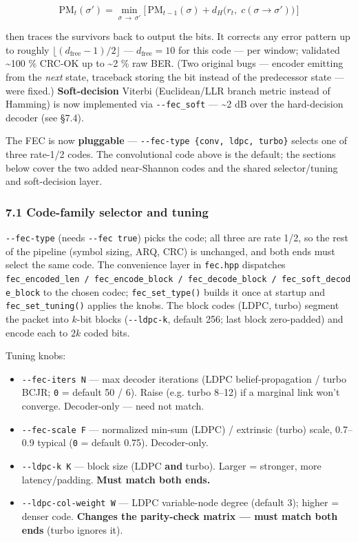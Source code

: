 \documentclass[
  10pt,
]{article}
\providecommand{\tightlist}{%
  \setlength{\itemsep}{0pt}\setlength{\parskip}{0pt}}
\begin{document}
\[ \text{PM}_t(\sigma') = \min_{\sigma \,\to\, \sigma'}
\Big[\, \text{PM}_{t-1}(\sigma) + d_H\big(r_t,\; c(\sigma\!\to\!\sigma')\big) \,\Big] \]

then traces the survivors back to output the bits. It corrects any error
pattern up to roughly \(\lfloor (d_\text{free}-1)/2 \rfloor\) ---
\(d_\text{free} = 10\) for this code --- per window; validated
\textasciitilde100 \% CRC-OK up to \textasciitilde2 \% raw BER. (Two
original bugs --- encoder emitting from the \emph{next} state, traceback
storing the bit instead of the predecessor state --- were fixed.)
\textbf{Soft-decision} Viterbi (Euclidean/LLR branch metric instead of
Hamming) is now implemented via \texttt{-\/-fec\_soft} ---
\textasciitilde2 dB over the hard-decision decoder (see §7.4).

The FEC is now \textbf{pluggable} ---
\texttt{-\/-fec-type\ \{conv,\ ldpc,\ turbo\}} selects one of three
rate-1/2 codes. The convolutional code above is the default; the
sections below cover the two added near-Shannon codes and the shared
selector/tuning and soft-decision layer.

\hypertarget{71-code-family-selector-and-tuning}{%
\subsubsection{7.1 Code-family selector and
tuning}\label{71-code-family-selector-and-tuning}}

\texttt{-\/-fec-type} (needs \texttt{-\/-fec\ true}) picks the code; all
three are rate 1/2, so the rest of the pipeline (symbol sizing, ARQ,
CRC) is unchanged, and both ends must select the same code. The
convenience layer in \texttt{fec.hpp} dispatches
\texttt{fec\_encoded\_len\ /\ fec\_encode\_block\ /\ fec\_decode\_block\ /\ fec\_soft\_decode\_block}
to the chosen codec; \texttt{fec\_set\_type()} builds it once at startup
and \texttt{fec\_set\_tuning()} applies the knobs. The block codes
(LDPC, turbo) segment the packet into \(k\)-bit blocks
(\texttt{-\/-ldpc-k}, default 256; last block zero-padded) and encode
each to \(2k\) coded bits.

Tuning knobs:

\begin{itemize}
\tightlist
\item
  \texttt{-\/-fec-iters\ N} --- max decoder iterations (LDPC
  belief-propagation / turbo BCJR; \texttt{0} = default 50 / 6). Raise
  (e.g. turbo 8--12) if a marginal link won't converge. Decoder-only ---
  need not match.
\item
  \texttt{-\/-fec-scale\ F} --- normalized min-sum (LDPC) / extrinsic
  (turbo) scale, 0.7--0.9 typical (\texttt{0} = default 0.75).
  Decoder-only.
\item
  \texttt{-\/-ldpc-k\ K} --- block size (LDPC \textbf{and} turbo).
  Larger = stronger, more latency/padding. \textbf{Must match both
  ends.}
\item
  \texttt{-\/-ldpc-col-weight\ W} --- LDPC variable-node degree (default
  3); higher = denser code. \textbf{Changes the parity-check matrix ---
  must match both ends} (turbo ignores it).
\end{itemize}
\end{document}
